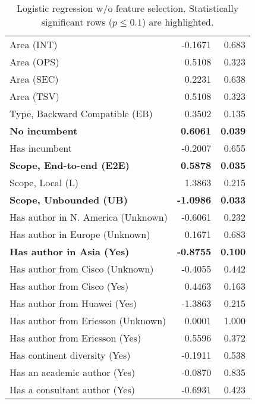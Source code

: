\begin{table}[t!]
\begin{tabular}{lrr}
Area (INT) & -0.1671 & 0.683 \\
Area (OPS) & 0.5108 & 0.323 \\
Area (SEC) & 0.2231 & 0.638 \\
Area (TSV) & 0.5108 & 0.323 \\
Type, Backward Compatible (EB) & 0.3502 & 0.135 \\
\textbf{No incumbent} & \textbf{0.6061} & \textbf{0.039} \\
Has incumbent & -0.2007 & 0.655 \\
\textbf{Scope, End-to-end (E2E)} & \textbf{0.5878} & \textbf{0.035} \\
Scope, Local (L) & 1.3863 & 0.215 \\
\textbf{Scope, Unbounded (UB)} & \textbf{-1.0986} & \textbf{0.033} \\
Has author in N. America (Unknown) & -0.6061 & 0.232 \\
Has author in Europe (Unknown) & 0.1671 & 0.683 \\
\textbf{Has author in Asia (Yes)} & \textbf{-0.8755} & \textbf{0.100} \\
Has author from Cisco (Unknown) & -0.4055 & 0.442 \\
Has author from Cisco (Yes) & 0.4463 & 0.163 \\
Has author from Huawei (Yes) & -1.3863 & 0.215 \\
Has author from Ericsson (Unknown) & 0.0001 & 1.000 \\
Has author from Ericsson (Yes) & 0.5596 & 0.372 \\
Has continent diversity (Yes) & -0.1911 & 0.538 \\
Has an academic author (Yes) & -0.0870 & 0.835 \\
Has a consultant author (Yes) & -0.6931 & 0.423 \\
\bottomrule
\end{tabular}
\caption{Logistic regression w/o feature selection. Statistically significant rows ($p \leq 0.1$) are highlighted.}
\label{tbl:statsnofs}
\end{table}
